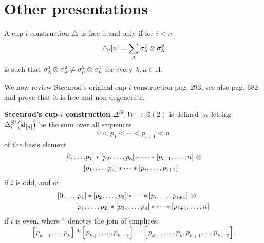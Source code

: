 
\section{Other presentations} \label{s:other presentations}

\begin{lemma} \label{lemma: free and non-deg in coproduct}
	A cup-$i$ construction $\triangle$ is free if and only if for $i < n$
	\[
	\triangle_i [n] = \sum_{\Lambda} \sigma^1_\lambda \otimes \sigma^2_\lambda
	\]
	is such that $\sigma^1_\lambda \otimes \sigma^2_\lambda \neq \sigma^2_\mu \otimes \sigma^1_\mu$ for every $\lambda, \mu \in \Lambda$.
\end{lemma}

We now review Steenrod's original cup-$i$ construction \cite{steenrod1947products} pag.  293, see also \cite{mcclure2003multivariable} pag. 682, and prove that it is free and non-degenerate.

\begin{definition}
	\textbf{Steenrod's cup-$i$ construction} $\Delta^{St} \colon W \to \mathcal{Z}(2)$ is defined by letting $\Delta_i^{St} \big( \mathsf{id}_{[n]} \big)$ be the sum over all sequences
	\[
	0 < p_1 < \cdots < p_{i+1} < n
	\]
	of the basis element
	\begin{equation} \label{equation: steenrod original i odd}
	\begin{split}
	[ 0, \dots, &{p_1} ] \ast [ {p_2}, \dots, {p_3} ] \ast \cdots \ast [ {p_{i+1}}, \dots, n ]\ \otimes \\
	[ &{p_1}, \dots, {p_2} ] \ast \cdots \ast [ {p_{i}}, \dots, {p_{i+1}} ]
	\end{split}
	\end{equation}
	if $i$ is odd, and of
	\begin{equation} \label{equation: steenrod original i even}
	\begin{split}
	[ 0, \dots, &{p_1} ] \ast [ {p_2}, \dots, {p_3} ] \ast \cdots \ast [ {p_{i}}, \dots, {p_{i+1}} ]\ \otimes \\
	[ &{p_1}, \dots, {p_2} ] \ast [ {p_3}, \dots, {p_4} ] \ast \cdots \ast [ {p_{i+1}}, \dots, n ]
	\end{split}
	\end{equation}
	if $i$ is even, where $\ast$ denotes the join of simplices:
	\[
	[{p_{k-1}}, \dots, {p_{k}} ] \ast [ {p_{k+1}}, \dots, p_{k+2}] = [{p_{k-1}}, \dots, p_k, p_{k+1}, \dots, p_{k+2}].
	\]
\end{definition}

